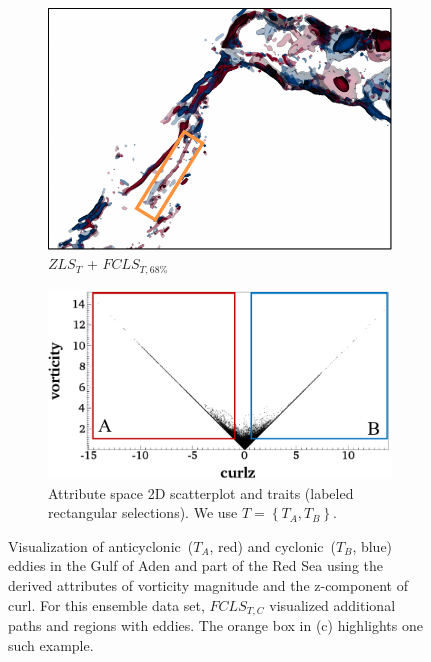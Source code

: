 \begin{figure}[!h]
\begin{subfigure}{0.245\linewidth}
\includegraphics[width=\linewidth]{Images/RedSeaEddy/fcls_68.pdf}
\vspace{-2mm}
\caption{$ZLS_{T}$ + $FCLS_{T,68\%}$}
\label{fig:rse_fcls}
\end{subfigure}
\hfill
\begin{subfigure}{0.24\linewidth}
\centering
\includegraphics[width=0.95\linewidth]{Images/RedSeaEddy/scatterplot.pdf}
\vspace{-2mm}
\caption{Attribute space 2D scatterplot and traits (labeled rectangular selections). We use $T = \left\{T_{A}, T_{B}\right\}$.} 
\label{fig:rse_scatterplot}
\end{subfigure}
\vspace{-2mm}
\caption{Visualization of anticyclonic~($T_{A}$, red) and cyclonic~($T_{B}$, blue) eddies in the Gulf of Aden and part of the Red Sea using the derived attributes of vorticity magnitude and the z-component of curl. For this ensemble data set, $FCLS_{T,C}$ visualized additional paths and regions with eddies. The orange box in (c) highlights one such example.}
\label{fig:rse}
\end{figure}
